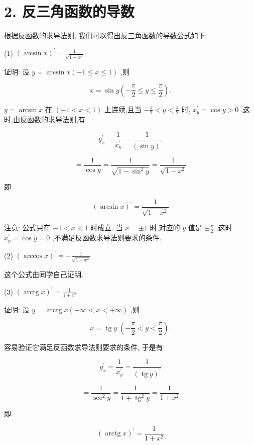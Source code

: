 \documentclass[lang=cn,newtx,12pt,scheme=chinese]{elegantbook}
\begin{document}
\section*{2. 反三角函数的导数}

根据反函数的求导法则, 我们可以得出反三角函数的导数公式如下:

(1) \({\left( \arcsin x\right) }^{\prime } = \frac{1}{\sqrt{1 - {x}^{2}}}\)

证明: 设 \(y = \arcsin x\left( {-1 \leq x \leq 1}\right)\) ,则

\[
x = \sin y\left( {-\frac{\pi }{2} \leq y \leq \frac{\pi }{2}}\right) .
\]

\(y = \arcsin x\) 在 \(\left( {-1 < x < 1}\right)\) 上连续,且当 \(- \frac{\pi }{2} < y < \frac{\pi }{2}\) 时, \({x}_{y}^{\prime } = \cos y > 0\) ,这时,由反函数的求导法则,有

\[
{y}_{x}^{\prime } = \frac{1}{{x}_{y}^{\prime }} = \frac{1}{{\left( \sin y\right) }^{\prime }}
\]

\[
= \frac{1}{\cos y} = \frac{1}{\sqrt{1 - {\sin }^{2}y}} = \frac{1}{\sqrt{1 - {x}^{2}}}
\]

即

\[
{\left( \arcsin x\right) }^{\prime } = \frac{1}{\sqrt{1 - {x}^{2}}}
\]

注意: 公式只在 \(- 1 < x < 1\) 时成立. 当 \(x = \pm 1\) 时,对应的 \(y\) 值是 \(\pm \frac{\pi }{2}\) ,这时 \({x}_{y}^{\prime } = \cos y = 0\) ,不满足反函数求导法则要求的条件.

(2) \({\left( \arccos x\right) }^{\prime } = - \frac{1}{\sqrt{1 - {x}^{2}}}\)

这个公式由同学自己证明.

(3) \({\left( \operatorname{arctg}x\right) }^{\prime } = \frac{1}{1 + {x}^{2}}\)

证明: 设 \(y = \operatorname{arctg}x\left( {-\infty < x < + \infty }\right)\) ,则

\[
x = \operatorname{tg}y\;\left( {-\frac{\pi }{2} < y < \frac{\pi }{2}}\right) .
\]

容易验证它满足反函数求导法则要求的条件, 于是有

\[
{y}_{x}^{\prime } = \frac{1}{{x}_{y}^{\prime }} = \frac{1}{{\left( \operatorname{tg}y\right) }^{\prime }}
\]

\[
= \frac{1}{{\sec }^{2}y} = \frac{1}{1 + {\operatorname{tg}}^{2}y} = \frac{1}{1 + {x}^{2}}
\]

即

\[
{\left( \operatorname{arctg}x\right) }^{\prime } = \frac{1}{1 + {x}^{2}}
\]
\end{document}
